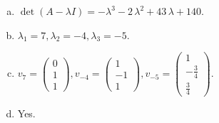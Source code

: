 \begin{questions}
\begin{solution}
\begin{enumerate}[(a)]
\item $\det(A-\lambda I)=-{\lambda}^{3} - 2 \, {\lambda}^{2} + 43 \, {\lambda} + 140$.
\item ${\lambda}_1=7, {\lambda}_2=-4, {\lambda}_3=-5$.
\item $v_{7}=\left(\begin{array}{r}
0 \\
1 \\
1
\end{array}\right), v_{-4}=\left(\begin{array}{r}
1 \\
-1 \\
1
\end{array}\right), v_{-5}=\left(\begin{array}{r}
1 \\
-\frac{3}{4} \\
\frac{3}{4}
\end{array}\right)$.
\item Yes.
\end{enumerate}
\end{solution}

\end{questions}

\newpage


\begin{center}
\end{center}

